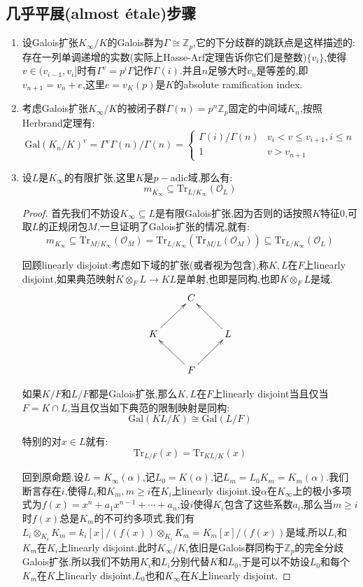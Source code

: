 \subsection{几乎平展(almost \'etale)步骤}
\begin{enumerate}
	\item 设Galois扩张$K_{\infty}/K$的Galois群为$\Gamma\cong\mathbb{Z}_p$,它的下分歧群的跳跃点是这样描述的:存在一列单调递增的实数(实际上Hasse-Arf定理告诉你它们是整数)$\{v_i\}$,使得$v\in (v_{i-1},v_i]$时有$\Gamma^v=p^i\Gamma$记作$\Gamma(i)$.并且$n$足够大时$v_n$是等差的,即$v_{n+1}=v_n+e$,这里$e=v_K(p)$是$K$的absolute ramification index.
	\item 考虑Galois扩张$K_{\infty}/K$的被闭子群$\Gamma(n)=p^n\mathbb{Z}_p$固定的中间域$K_n$,按照Herbrand定理有:
	$$\mathrm{Gal}(K_n/K)^v=\Gamma^v\Gamma(n)/\Gamma(n)=\left\{\begin{array}{cc}\Gamma(i)/\Gamma(n)&v_i<v\le v_{i+1},i\le n\\1&v>v_{n+1}\end{array}\right.$$
	\item 设$L$是$K_{\infty}$的有限扩张,这里$K$是$p-$adic域,那么有:
	$$m_{K_{\infty}}\subseteq\mathrm{Tr}_{L/K_{\infty}}(\mathscr{O}_L)$$
	\begin{proof}
		
		首先我们不妨设$K_{\infty}\subseteq L$是有限Galois扩张,因为否则的话按照$K$特征0,可取$L$的正规闭包$M$,一旦证明了Galois扩张的情况,就有:
		$$m_{K_{\infty}}\subseteq\mathrm{Tr}_{M/K_{\infty}}(\mathscr{O}_M)=\mathrm{Tr}_{L/K_{\infty}}(\mathrm{Tr}_{M/L}(\mathscr{O}_M))\subseteq\mathrm{Tr}_{L/K_{\infty}}(\mathscr{O}_L)$$
		
		回顾linearly disjoint:考虑如下域的扩张(或者视为包含),称$K,L$在$F$上linearly disjoint,如果典范映射$K\otimes_FL\to KL$是单射,也即是同构,也即$K\otimes_FL$是域.
		$$\xymatrix{&C&\\K\ar[ur]&&L\ar[ul]\\&F\ar[ul]\ar[ur]&}$$
		
		如果$K/F$和$L/F$都是Galois扩张,那么$K,L$在$F$上linearly disjoint当且仅当$F=K\cap L$,当且仅当如下典范的限制映射是同构:
		$$\mathrm{Gal}(KL/K)\cong\mathrm{Gal}(L/F)$$
		
		特别的对$x\in L$就有:
		$$\mathrm{Tr}_{L/F}(x)=\mathrm{Tr}_{KL/K}(x)$$
		
		\qquad
		
		回到原命题.设$L=K_{\infty}(\alpha)$,记$L_0=K(\alpha)$,记$L_m=L_0K_m=K_m(\alpha)$.我们断言存在$i$,使得$L_i$和$K_m,m\ge i$在$K_i$上linearly disjoint.设$\alpha$在$K_{\infty}$上的极小多项式为$f(x)=x^n+a_1x^{n-1}+\cdots+a_n$,设$i$使得$K_i$包含了这些系数$a_i$,那么当$m\ge i$时$f(x)$总是$K_m$的不可约多项式,我们有$L_i\otimes_{K_i}K_m=k_i[x]/(f(x))\otimes_{K_i}K_m=K_m[x]/(f(x))$是域,所以$L_i$和$K_m$在$K_i$上linearly disjoint.此时$K_{\infty}/K_i$依旧是Galois群同构于$\mathbb{Z}_p$的完全分歧Galois扩张.所以我们不妨用$K_i$和$L_i$分别代替$K$和$L_0$,于是可以不妨设$L_0$和每个$K_m$在$K$上linearly disjoint,$L_0$也和$K_{\infty}$在$K$上linearly disjoint.
		

\end{proof}
\end{enumerate}
